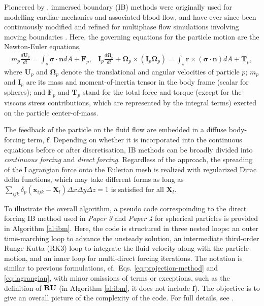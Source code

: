 Pioneered by \cite{Peskin}, immersed boundary (IB) methods were originally used for modelling cardiac mechanics and associated blood flow, and have ever since been continuously modified and refined for multiphase flow simulations involving moving boundaries \citep{fadlun_verzicco_orlandi_mohd-yusof_2000a, Uhlmann, mittal_iaccarino_2005a, pinelli_naqavi_piomelli_favier_2010a, Wim-Paul_JCP_2012, favier_revell_pinelli_2014a}.
Here, the governing equations for the particle motion are the Newton-Euler equations,
\begin{subequations} \label{eq:newton-euler}
  \begin{equation} 
    \begin{aligned} \label{eq:force-balance}
      m_p \frac{d{\bm U}_p}{dt} = \int_{s} \bm{\sigma \cdot n} dA + {\bm F}_p, 
    \end{aligned}
  \end{equation}
  \begin{equation} 
    \begin{aligned}
      {\bm I}_p \frac{d{\bm \Omega}_p}{dt} + {\bm \Omega}_p\times({\bm I}_p{\bm \Omega}_p) =
      \int_{s} \bm{r} \times (\bm{\sigma \cdot n}) dA + {\bm T}_p,
    \end{aligned}
  \end{equation}
\end{subequations}
where ${\bm U}_p$ and ${\bm \Omega}_p$ denote the translational and angular velocities of particle $p$;
$m_p$ and ${\bm I}_p$ are its mass and moment-of-inertia tensor in the body frame (scalar for spheres); and 
${\bm F}_p$ and ${\bm T}_p$ stand for the total force and torque (except for the viscous stress contributions, which are represented by the integral terms) exerted on the particle center-of-mass.

The feedback of the particle on the fluid flow are embedded in a diffuse body-forcing term, $\bm f$.
Depending on whether it is incorporated into the continuous equations before or after discretisation, IB methods can be broadly divided into \emph{continuous forcing} and \emph{direct forcing}.
Regardless of the approach, the spreading of the Lagrangian force onto the Eulerian mesh is realized with regularized Dirac delta functions, which may take different forms as long as $\sum_{ijk} \delta_p( \bm{x}_{ijk}-\bm{X}_{l}) \Delta x \Delta y \Delta z=1$ is satisfied for all $\bm{X}_{l}$.

To illustrate the overall algorithm, a pseudo code correspoinding to the direct forcing IB method used in \emph{Paper 3} and \emph{Paper 4} for spherical particles is provided in Algorithm \ref{al:ibm}.
Here, the code is structured in three nested loops:
an outer time-marching loop to advance the unsteady solution,
an intermediate third-order Runge-Kutta (RK3) loop to integrate the fluid velocity along with the particle motion,
and an inner loop for multi-direct forcing iterations.
The notation is similar to previous formulations, cf.\ Eqs. \eqref{eq:projection-method} and \eqref{eq:lagrangian}, with minor omissions of terms or exceptions, such as the definition of ${\bf RU}$ (in Algorithm \ref{al:ibm}, it does not include $\bm f$).
The objective is to give an overall picture of the complexity of the code. For full details, see \cite{ Wim-Paul_JCP_2012}.


